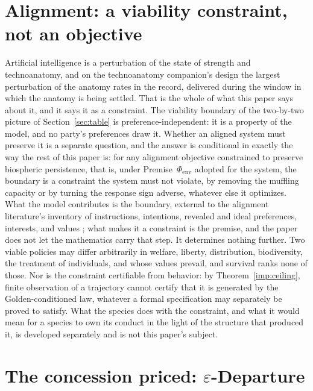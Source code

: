 \section{Alignment: a viability constraint, not an objective}\label{sec:alignment}

Artificial intelligence is a perturbation of the state of strength and
technoanatomy, and on the technoanatomy companion's design the largest
perturbation of the anatomy rates in the record, delivered during the window in which the
anatomy is being settled. That is the whole of what this paper says
about it, and it says it as a constraint. The viability boundary of the two-by-two picture of
Section~\ref{sec:table} is preference-independent: it is a property of
the model, and no party's preferences draw it. Whether an aligned
system must preserve it is a separate question, and the answer is
conditional in exactly the way the rest of this paper is: for any
alignment objective constrained to preserve biospheric persistence,
that is, under Premise~$\Phi_{\mathrm{env}}$ adopted for the system,
the boundary is a constraint the system must not violate, by removing
the muffling capacity or by turning the response sign adverse, whatever
else it optimizes. What the model contributes is the boundary, external
to the alignment literature's inventory of instructions, intentions,
revealed and ideal preferences, interests, and values
\cite{Gabriel20}; what makes it a constraint is the premise, and the
paper does not let the mathematics carry that step. It determines
nothing further. Two viable policies may differ arbitrarily
in welfare, liberty, distribution, biodiversity, the treatment of
individuals, and whose values prevail, and survival ranks none of
those. Nor is the constraint certifiable from behavior: by
Theorem~\ref{imp:ceiling}, finite observation of a trajectory cannot
certify that it is generated by the Golden-conditioned law, whatever a
formal specification may separately be proved to satisfy. What the
species does with the constraint, and what it would mean for a species
to own its conduct in the light of the structure that produced it, is
developed separately and is not this paper's subject.

\section{The concession priced: \texorpdfstring{$\varepsilon$}{epsilon}-Departure}\label{sec:epsilon}

